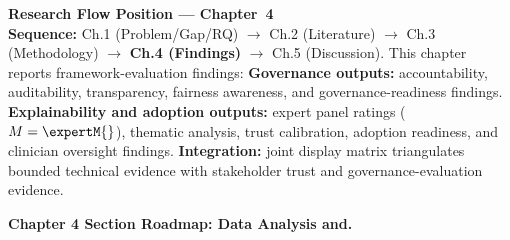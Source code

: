 \medskip\noindent
\small\textbf{Research Flow Position --- Chapter~4}\\[3pt]
\textbf{Sequence:} Ch.1 (Problem/Gap/RQ) $\to$ Ch.2 (Literature) $\to$ Ch.3 (Methodology) $\to$ \textbf{Ch.4 (Findings)} $\to$ Ch.5 (Discussion).
This chapter reports framework-evaluation findings:
\textbf{Governance outputs:} accountability, auditability, transparency, fairness awareness, and governance-readiness findings.
\textbf{Explainability and adoption outputs:} expert panel ratings ($M = \expertM{}$), thematic analysis, trust calibration, adoption readiness, and clinician oversight findings.
\textbf{Integration:} joint display matrix triangulates bounded technical evidence with stakeholder trust and governance-evaluation evidence.

\vspace{0.5em}


\noindent\textbf{Chapter 4 Section Roadmap: Data Analysis and.}


